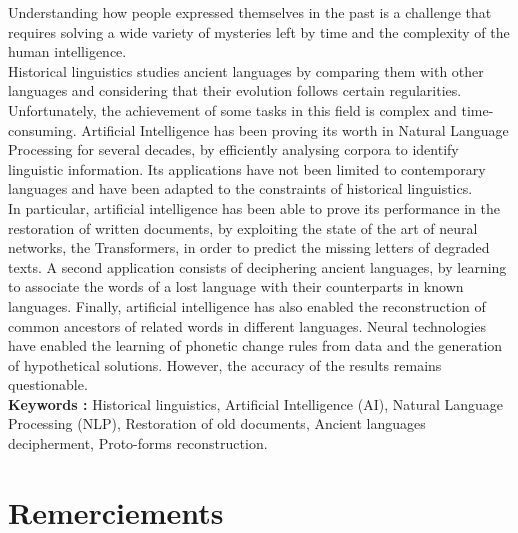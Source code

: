 \documentclass[12pt, twoside]{report}
\begin{document}
Understanding how people expressed themselves in the past is a challenge that requires solving a wide variety of mysteries left by time and the complexity of the human intelligence.\\

Historical linguistics studies ancient languages by comparing them with other languages and considering that their evolution follows certain regularities. Unfortunately, the achievement of some tasks in this field is complex and time-consuming. Artificial Intelligence has been proving its worth in Natural Language Processing for several decades, by efficiently analysing corpora to identify linguistic information. Its applications have not been limited to contemporary languages and have been adapted to the constraints of historical linguistics.\\
\indent In particular, artificial intelligence has been able to prove its performance in the restoration of written documents, by exploiting the state of the art of neural networks, the Transformers, in order to predict the missing letters of degraded texts. A second application consists of deciphering ancient languages, by learning to associate the words of a lost language with their counterparts in known languages. Finally, artificial intelligence has also enabled the reconstruction of common ancestors of related words in different languages. Neural technologies have enabled the learning of phonetic change rules from data and the generation of hypothetical solutions. However, the accuracy of the results remains questionable.\\

\textbf{Keywords :} Historical linguistics, Artificial Intelligence (AI),  Natural Language Processing (NLP), Restoration of old documents, Ancient languages decipherment, Proto-forms reconstruction.

\section*{Remerciements}
\end{document}
